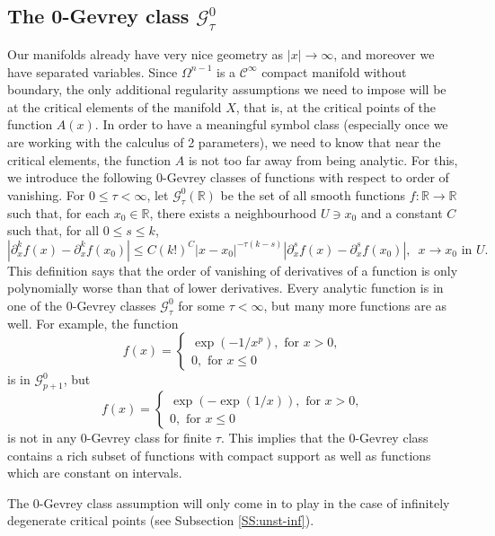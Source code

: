 \documentclass[twoside, final]{amsart}
\theoremstyle{definition}
\numberwithin{equation}{section}
\begin{document}
\subsection{The 0-Gevrey class ${\mathcal{G}}^0_\tau$}

Our manifolds already have very nice geometry as $| x | \to \infty$,
and moreover we have separated variables.  Since $\Omega^{n-1}$ is a
${{\mathcal C}^\infty}$ compact manifold without boundary, the only additional
regularity assumptions we need to impose will be at the critical elements
of the manifold $X$, that is, at the critical points of the function $A(x)$.  
In order to have a
meaningful symbol class (especially once we are working with the
calculus of 2 parameters), we need to know that near the critical
elements, the function $A$ is not too far away from being analytic.  For this, we introduce the
following 
0-Gevrey classes of functions with respect to order of vanishing.  For $0 {\leqslant} \tau <
\infty$, let ${\mathcal{G}}^0_\tau (
{{\mathbb R}} )$ be the set of all smooth functions $f : {{\mathbb R}} \to {{\mathbb R}}$
such that, for each $x_0 \in {{\mathbb R}}$, there exists a neighbourhood $U \ni
x_0$ and a constant $C$ such that, for all $0 {\leqslant} s {\leqslant} k$, 
\[
| \partial_x^k f(x) -\partial_x^k f(x_0) | {\leqslant} C (k!)^C | x - x_0
|^{-\tau (k-s) } | \partial_x^s f(x) - \partial_x^s f(x_0) |, \,\,\, x
\to x_0 \text{ in } U.
\]
This definition says that the order of vanishing of derivatives of a
function is only polynomially worse than that of lower derivatives.
Every analytic function is in one of the 0-Gevrey classes ${\mathcal{G}}^0_\tau$
for some $\tau < \infty$, but many more functions are as well.   
For example, the function
\[
f(x) = \begin{cases} \exp (-1/x^p), \text{ for } x >0, \\ 0, \text{ for }x {\leqslant} 0
\end{cases}
\]
is in ${\mathcal{G}}^0_{p+1}$, but
\[
f(x) = \begin{cases} \exp (-\exp(1/x)), \text{ for } x >0, \\ 0, \text{ for }x {\leqslant} 0
\end{cases}
\]
is not in any 0-Gevrey class for finite $\tau$.  This implies that the
0-Gevrey class contains a rich subset of functions with compact
support as well as functions which are constant on intervals.

The 0-Gevrey class assumption will only come in to play in the
case of infinitely degenerate critical points (see Subsection \ref{SS:unst-inf}).
\end{document}
